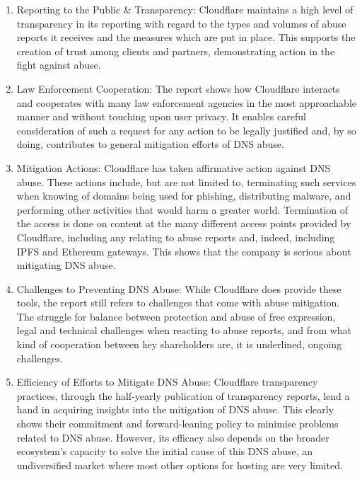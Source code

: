 \begin{enumerate}
\begin{enumerate}

\item Reporting to the Public \& Transparency: Cloudflare maintains a high level of transparency in its reporting with regard to the types and volumes of abuse reports it receives and the measures which are put in place. This supports the creation of trust among clients and partners, demonstrating action in the fight against abuse.

\item Law Enforcement Cooperation: The report shows how Cloudflare interacts and cooperates with many law enforcement agencies in the most approachable manner and without touching upon user privacy. It enables careful consideration of such a request for any action to be legally justified and, by so doing, contributes to general mitigation efforts of DNS abuse.

\item Mitigation Actions: Cloudflare has taken affirmative action against DNS abuse. These actions include, but are not limited to, terminating such services when knowing of domains being used for phishing, distributing malware, and performing other activities that would harm a greater world. Termination of the access is done on content at the many different access points provided by Cloudflare, including any relating to abuse reports and, indeed, including IPFS and Ethereum gateways. This shows that the company is serious about mitigating DNS abuse.

\item Challenges to Preventing DNS Abuse: While Cloudflare does provide these tools, the report still refers to challenges that come with abuse mitigation. The struggle for balance between protection and abuse of free expression, legal and technical challenges when reacting to abuse reports, and from what kind of cooperation between key shareholders are, it is underlined, ongoing challenges.

\item Efficiency of Efforts to Mitigate DNS Abuse: Cloudflare transparency practices, through the half-yearly publication of transparency reports, lend a hand in acquiring insights into the mitigation of DNS abuse. This clearly shows their commitment and forward-leaning policy to minimise problems related to DNS abuse. However, its efficacy also depends on the broader ecosystem's capacity to solve the initial cause of this DNS abuse, an undiversified market where most other options for hosting are very limited.


\end{enumerate}
\end{enumerate}

